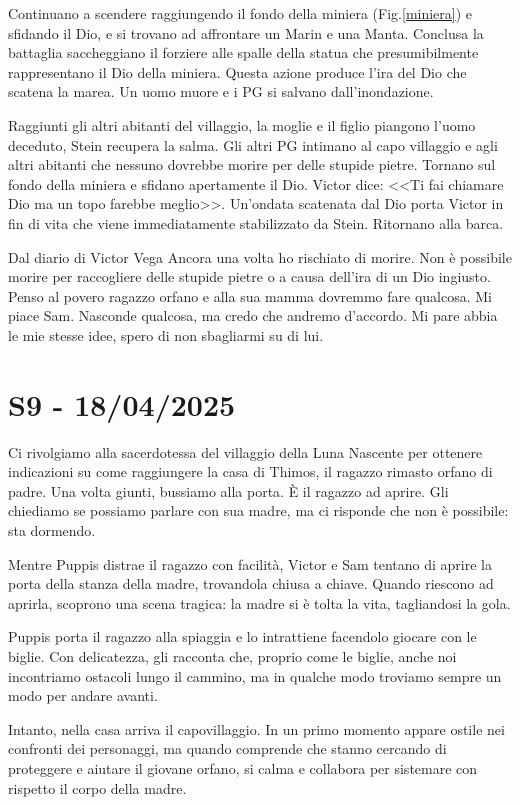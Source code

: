 \documentclass[letterpaper,twocolumn,openany, nodeprecatedcode, nomultitoc]{dndbook}
\begin{document}
Continuano a scendere raggiungendo il fondo della miniera (Fig.\ref{miniera}) e sfidando il Dio, e si trovano ad affrontare un Marin e una Manta. Conclusa la battaglia saccheggiano il forziere alle spalle della statua che presumibilmente rappresentano il Dio della miniera. Questa azione produce l'ira del Dio che scatena la marea. Un uomo muore e i PG si salvano dall'inondazione.

Raggiunti gli altri abitanti del villaggio, la moglie e il figlio piangono l'uomo deceduto, Stein recupera la salma. Gli altri PG intimano al capo villaggio e agli altri abitanti che nessuno dovrebbe morire per delle stupide pietre. Tornano sul fondo della miniera e sfidano apertamente il Dio. Victor dice: <<Ti fai chiamare Dio ma un topo farebbe meglio>>. Un'ondata scatenata dal Dio porta Victor in fin di vita che viene immediatamente stabilizzato da Stein. Ritornano alla barca.
\begin{DndComment}{Dal diario di Victor Vega}
Ancora una volta ho rischiato di morire. Non è possibile morire per raccogliere delle stupide pietre o a causa dell'ira di un Dio ingiusto. Penso al povero ragazzo orfano e alla sua mamma dovremmo fare qualcosa. Mi piace Sam. Nasconde qualcosa, ma credo che andremo d'accordo. Mi pare abbia le mie stesse idee, spero di non sbagliarmi su di lui.
\end{DndComment}

\section{S9 - 18/04/2025}
Ci rivolgiamo alla sacerdotessa del villaggio della Luna Nascente per ottenere indicazioni su come raggiungere la casa di Thimos, il ragazzo rimasto orfano di padre. Una volta giunti, bussiamo alla porta. È il ragazzo ad aprire. Gli chiediamo se possiamo parlare con sua madre, ma ci risponde che non è possibile: sta dormendo.

Mentre Puppis distrae il ragazzo con facilità, Victor e Sam tentano di aprire la porta della stanza della madre, trovandola chiusa a chiave. Quando riescono ad aprirla, scoprono una scena tragica: la madre si è tolta la vita, tagliandosi la gola.

Puppis porta il ragazzo alla spiaggia e lo intrattiene facendolo giocare con le biglie. Con delicatezza, gli racconta che, proprio come le biglie, anche noi incontriamo ostacoli lungo il cammino, ma in qualche modo troviamo sempre un modo per andare avanti.

Intanto, nella casa arriva il capovillaggio. In un primo momento appare ostile nei confronti dei personaggi, ma quando comprende che stanno cercando di proteggere e aiutare il giovane orfano, si calma e collabora per sistemare con rispetto il corpo della madre.
\end{document}
